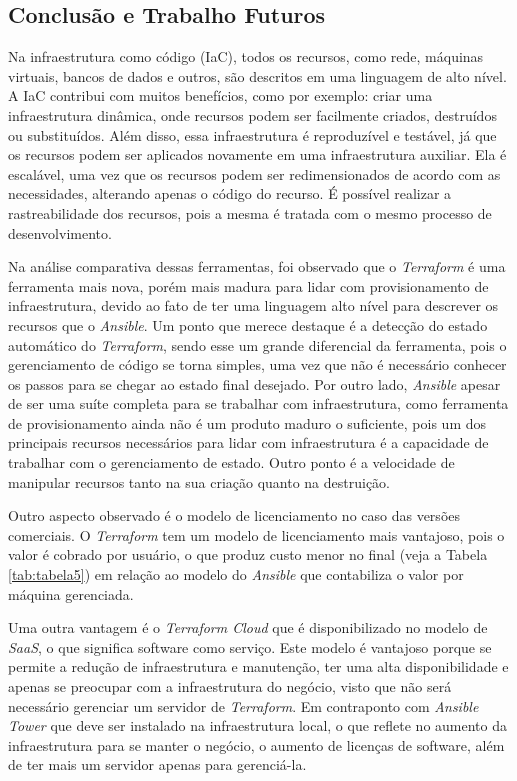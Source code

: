 \subsection{Conclusão e Trabalho Futuros}
Na infraestrutura como código (IaC), todos os recursos, como rede, máquinas virtuais, bancos de dados e outros, são descritos em uma linguagem de alto nível. A IaC contribui com muitos benefícios, como por exemplo: criar uma infraestrutura dinâmica, onde recursos podem ser facilmente criados, destruídos ou substituídos. Além disso, essa infraestrutura é reproduzível e testável, já que os recursos podem ser aplicados novamente em uma infraestrutura auxiliar. Ela é escalável, uma vez que os recursos podem ser redimensionados de acordo com as necessidades, alterando apenas o código do recurso. É possível realizar a rastreabilidade dos recursos, pois a mesma é tratada com o mesmo processo de desenvolvimento. 

Na análise comparativa dessas ferramentas, foi observado que o \textit{Terraform} é uma ferramenta mais nova, porém mais madura para lidar com provisionamento de infraestrutura, devido ao fato de ter uma linguagem alto nível para descrever os recursos que o \textit{Ansible}. Um ponto que merece destaque é a detecção do estado automático do \textit{Terraform}, sendo esse um grande diferencial da ferramenta, pois o gerenciamento de código se torna simples, uma vez que não é necessário conhecer os passos para se chegar ao estado final desejado. Por outro lado,  \textit{Ansible} apesar de ser uma suíte completa para se trabalhar com infraestrutura, como ferramenta de provisionamento ainda não é um produto maduro o suficiente, pois um dos principais recursos necessários para lidar com infraestrutura é a capacidade de trabalhar com o gerenciamento de estado. Outro ponto é a velocidade de manipular recursos tanto na sua criação quanto na destruição. 

Outro aspecto observado é o modelo de licenciamento no caso das versões comerciais. O \textit{Terraform} tem um modelo de licenciamento mais vantajoso, pois o valor é cobrado por usuário, o que produz custo menor no final (veja a Tabela \ref{tab:tabela5}) em relação ao modelo do \textit{Ansible} que contabiliza o valor por máquina gerenciada. 

Uma outra vantagem é o \textit{Terraform Cloud} que é disponibilizado no modelo de \textit{SaaS}, o que significa software como serviço. Este modelo é vantajoso porque se permite a redução de infraestrutura e manutenção, ter uma alta disponibilidade e apenas se preocupar com a infraestrutura do negócio, visto que não será necessário gerenciar um servidor de \textit{Terraform}. Em contraponto com \textit{Ansible Tower} que deve ser instalado na infraestrutura local, o que reflete no aumento da infraestrutura para se manter o negócio, o aumento de licenças de software, além de ter mais um servidor apenas para gerenciá-la. 

